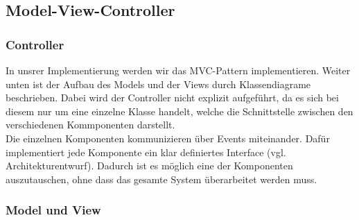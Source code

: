\subsection{Model-View-Controller}
\subsubsection{Controller}
In unsrer Implementierung werden wir das MVC-Pattern implementieren. Weiter unten ist der Aufbau des Models und der Views durch Klassendiagrame beschrieben.
Dabei wird der Controller nicht explizit aufgeführt, da es sich bei diesem nur um eine einzelne Klasse handelt, welche die Schnittstelle zwischen den
verschiedenen Kommponenten darstellt.\\
Die einzelnen Komponenten kommunizieren über Events miteinander. Dafür implementiert jede Komponente ein klar definiertes Interface (vgl. Architekturentwurf).
Dadurch ist es möglich eine der Komponenten auszutauschen, ohne dass das gesamte System überarbeitet werden muss.

\subsubsection{Model und View}



